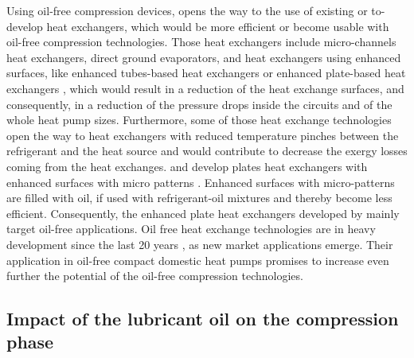 Using oil-free compression devices, opens the way to the use of
existing or to-develop heat exchangers, which would be more efficient
or become usable with oil-free compression technologies. Those heat
exchangers include micro-channels heat exchangers, direct ground
evaporators, and heat exchangers using enhanced surfaces, like
enhanced tubes-based heat exchangers
\citep{Ribatski-Jacobi-2005a,Habert-2009a,vanrooyen-2011a} or enhanced
plate-based heat exchangers \citep{Furberg-2006a}, which would result
in a reduction of the heat exchange surfaces, and consequently, in a
reduction of the pressure drops inside the circuits and of the whole
heat pump sizes. Furthermore, some of those heat exchange technologies
open the way to heat exchangers with reduced temperature pinches
between the refrigerant and the heat source and would contribute to
decrease the exergy losses coming from the heat
exchanges. \citet{Furberg-2006a} and \citet{Li-2008a} develop plates
heat exchangers with enhanced surfaces with micro patterns
\citep{Furberg-Muhammed-2009a}. Enhanced surfaces with micro-patterns
are filled with oil, if used with refrigerant-oil mixtures
\citep[Fig.\,10\,\&\,11 p.\,985--986]{Spindler-Hahne-2009a} and
thereby become less efficient. Consequently, the enhanced plate heat
exchangers developed by \citep{Furberg-Muhammed-2009a} mainly target
oil-free applications. Oil free heat exchange technologies are in
heavy development since the last 20 years \citep[Fig.\,1 p.\,186]{BandarraFilho-Thome-2009a}, as new market applications
emerge. Their application in oil-free compact domestic heat pumps
promises to increase even further the potential of the oil-free
compression technologies.

\subsection{Impact of the lubricant oil on the
  compression phase}
\label{sec:oil-cp}

